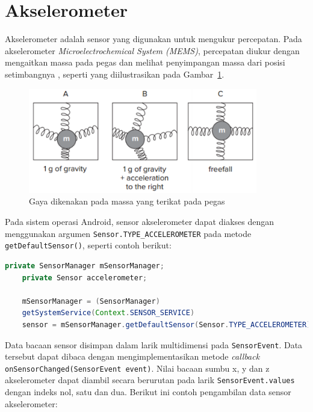 \section{Akselerometer}
Akselerometer adalah sensor yang digunakan untuk mengukur percepatan. Pada akselerometer \textit{Microelectrochemical System (MEMS)}, percepatan diukur dengan mengaitkan massa pada pegas dan melihat penyimpangan massa dari posisi setimbangnya \citep{milette-2012}, seperti yang diilustrasikan pada Gambar~\ref{gambar:akselerometer-mems}.

\begin{figure}[h!]
    \centering
    \includegraphics[width=10cm]{gambar/landasan-teori/akselerometer-mems.png}
    \caption{Gaya dikenakan pada massa yang terikat pada pegas \citep{milette-2012}}
    \label{gambar:akselerometer-mems}
\end{figure}

Pada sistem operasi Android, sensor akselerometer dapat diakses dengan menggunakan argumen \lstinline{Sensor.TYPE_ACCELEROMETER} pada metode \lstinline{getDefaultSensor()}, seperti contoh berikut:

\begin{lstlisting}[language=Java]
    private SensorManager mSensorManager;
    private Sensor accelerometer;

    mSensorManager = (SensorManager)
    getSystemService(Context.SENSOR_SERVICE)
    sensor = mSensorManager.getDefaultSensor(Sensor.TYPE_ACCELEROMETER)
\end{lstlisting}

Data bacaan sensor disimpan dalam larik multidimensi pada \lstinline{SensorEvent}. Data tersebut dapat dibaca dengan mengimplementasikan metode \textit{callback} \linebreak \lstinline{onSensorChanged(SensorEvent event)}. Nilai bacaan sumbu x, y dan z akselerometer dapat diambil secara berurutan pada larik \lstinline{SensorEvent.values} dengan indeks nol, satu dan dua. Berikut ini contoh pengambilan data sensor akselerometer:

